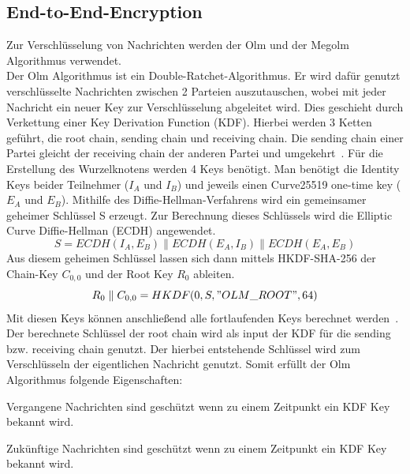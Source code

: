     \newpage
    \subsection{End-to-End-Encryption}\label{subsec:verwendete-schlussel}
    Zur Verschlüsselung von Nachrichten werden der Olm und der Megolm Algorithmus verwendet.\\
    Der Olm Algorithmus ist ein Double-Ratchet-Algorithmus.
    Er wird dafür genutzt verschlüsselte Nachrichten zwischen 2 Parteien auszutauschen, wobei mit jeder Nachricht ein neuer Key zur Verschlüsselung abgeleitet wird.
    Dies geschieht durch Verkettung einer Key Derivation Function (KDF).
    Hierbei werden 3 Ketten geführt, die root chain, sending chain und receiving chain.
    Die sending chain einer Partei gleicht der receiving chain der anderen Partei und umgekehrt~\cite{perrin2016double}.
    Für die Erstellung des Wurzelknotens werden 4 Keys benötigt.
    Man benötigt die Identity Keys beider Teilnehmer ($I_A$ und $I_B$) und jeweils einen Curve25519 one-time key ($E_A$ und $E_B$).
    Mithilfe des Diffie-Hellman-Verfahrens wird ein gemeinsamer geheimer Schlüssel S erzeugt.
    Zur Berechnung dieses Schlüssels wird die Elliptic Curve Diffie-Hellman (ECDH) angewendet.
    \begin{displaymath}
        S = ECDH(I_A,E_B)\parallel ECDH(E_A,I_B) \parallel ECDH(E_A,E_B)
    \end{displaymath}
    Aus diesem geheimen Schlüssel lassen sich dann mittels HKDF-SHA-256 der Chain-Key $C_{0,0}$ und der Root Key $R_0$ ableiten.
    \begin{displaymath}
        R_0 \parallel C_{0,0} = HKDF(0,S,"OLM\_ROOT",64)
    \end{displaymath}
    Mit diesen Keys können anschließend alle fortlaufenden Keys berechnet werden~\cite{olm}.
    Der berechnete Schlüssel der root chain wird als input der KDF für die sending bzw. receiving chain genutzt.
    Der hierbei entstehende Schlüssel wird zum Verschlüsseln der eigentlichen Nachricht genutzt.
    Somit erfüllt der Olm Algorithmus folgende Eigenschaften:
    \begin{description}[leftmargin=!,labelwidth=3cm]
        \item [Resilience]
        \item [Forward security] Vergangene Nachrichten sind geschützt wenn zu einem Zeitpunkt ein KDF Key bekannt wird.
        \item [Break-in recovery] Zukünftige Nachrichten sind geschützt wenn zu einem Zeitpunkt ein KDF Key bekannt wird.
    \end{description}

